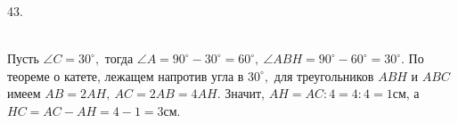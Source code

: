 43. \begin{figure}[ht!]
\end{figure}\\
Пусть $\angle C=30^\circ,$ тогда $\angle A=90^\circ-30^\circ=60^\circ,\ \angle ABH=90^\circ-60^\circ=30^\circ.$ По теореме о катете, лежащем напротив угла в $30^\circ,$ для треугольников $ABH$ и $ABC$ имеем $AB=2AH,\ AC=2AB=4AH.$ Значит, $AH=AC:4=4:4=1$см, а $HC=AC-AH=4-1=3$см.\\
